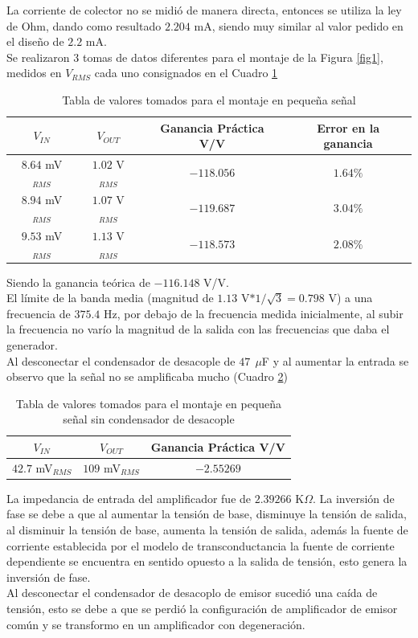 \documentclass[10pt,graphicx,caption,rotating]{article}
\begin{document}
\noindent
La corriente de colector no se midió de manera directa, entonces se utiliza la ley de Ohm, dando como resultado $2.204$ mA, siendo muy similar al valor pedido en el diseño de $2.2$ mA.\\
Se realizaron 3 tomas de datos diferentes para el montaje de la Figura \ref{fig1}, medidos en $V_{RMS}$ cada uno consignados en el Cuadro \ref{tab3}
\begin{table}[H]
	\centering
\begin{tabular}[c]{|c|c|c|c|} \hline
$V_{IN}$ & $V_{OUT}$ & \textbf{Ganancia Práctica} V/V & \textbf{Error en la ganancia} \\ \hline
$8.64$ mV$_{RMS}$ & $1.02$ V$_{RMS}$ & $-118.056$ & $1.64\%$ \\ \hline
$8.94$ mV$_{RMS}$ & $1.07$ V$_{RMS}$ & $-119.687$ & $3.04\%$ \\ \hline
$9.53$ mV$_{RMS}$ & $1.13$ V$_{RMS}$ & $-118.573$ & $2.08\%$ \\ \hline
\end{tabular}
	\caption{Tabla de valores tomados para el montaje en pequeña señal}
	\label{tab3}
\end{table}
\noindent
Siendo la ganancia teórica de $-116.148$ V/V.\\
El límite de la banda media (magnitud de $1.13$ V$*1/ \sqrt{3}=0.798$ V)  a una frecuencia de $375.4$ Hz, por debajo de la frecuencia medida inicialmente, al subir la frecuencia no varío la magnitud de la salida con las frecuencias que daba el generador.\\
Al desconectar el condensador de desacople de $47\ \ \mu$F y al aumentar la entrada se observo que la señal no se amplificaba mucho (Cuadro \ref{tab4})
\begin{table}[H]
	\centering
\begin{tabular}[c]{|c|c|c|} \hline
$V_{IN}$ & $V_{OUT}$ & \textbf{Ganancia Práctica} V/V \\ \hline
$42.7$ mV$_{RMS}$ & $109$ mV$_{RMS}$ & $-2.55269$ \\ \hline
\end{tabular}
	\caption{Tabla de valores tomados para el montaje en pequeña señal sin condensador de desacople}
	\label{tab4}
\end{table}
\noindent
La impedancia de entrada del amplificador fue de $2.39266$ K$\Omega$. La inversión de fase se debe a que al aumentar la tensión de base, disminuye la tensión de salida, al disminuir la tensión de base, aumenta la tensión de salida, además la fuente de corriente establecida por el modelo de transconductancia la fuente de corriente dependiente se encuentra en sentido opuesto a la salida de tensión, esto genera la inversión de fase.\\
Al desconectar el condensador de desacoplo de emisor sucedió una caída de tensión, esto se debe a que se perdió la configuración de amplificador de emisor común y se transformo en un amplificador con degeneración.
\end{document}
